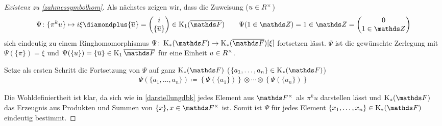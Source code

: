 \documentclass[ngerman,fontsize=11pt, paper=a4, parskip=half, titlepage=true, toc=bib]{scrartcl}
\begin{document}
\begin{proof}[Existenz zu \ref{zahmessymbolhom}]
  Als nächstes zeigen wir, dass die Zuweisung ($u\in R^\times$)
  \begin{gather*}
    \Psi\colon\{\pi^ku\}\mapsto i\xi \p \{\ov u\}
    =\begin{pmatrix} i\\\{\ov u\} \end{pmatrix}\in\K_1(\bF)
    \qquad \Psi(1\in\Z)=1\in\Z=\begin{pmatrix}0\\1\in\Z\end{pmatrix}
  \end{gather*}
  sich eindeutig zu einem Ringhomomorphismus
  $\Psi\colon\KF\to\KbF[\xi]$ fortsetzen lässt.
  $\Psi$ ist die gewünschte Zerlegung mit $\Psi(\{\pi\})=\xi$ 
  und $\Psi(\{u\})=\{\ov u\}\in\K_1\bF$ für
  eine Einheit $u\in R^\times$.

  Setze als ersten Schritt die Fortsetzung von $\Psi$ auf ganz $\KF$
  ($\{a_1,\dotsc,a_n\}\in\KF$)
  \begin{gather*}
    \Psi(\{a_1,\dotsc,a_n\})
    \coloneqq \left\{\Psi(\{a_1\})\right\}\otimes\dotsb
      \otimes \left\{\Psi(\{a_n\})\right\}
  \end{gather*}

  Die Wohldefiniertheit ist klar, da sich wie in \ref{darstellungdbk}
  jedes Element aus $\Fx$ als $\pi^k u$ darstellen lässt und
  $\KF$ das Erzeugnis aus Produkten und Summen von $\{x\}, x\in\Fx$
  ist. Somit ist $\Psi$ für jedes Element $\{x_1,\dotsc,x_n\}\in\KF$ 
  eindeutig bestimmt.


\end{proof}
\end{document}
